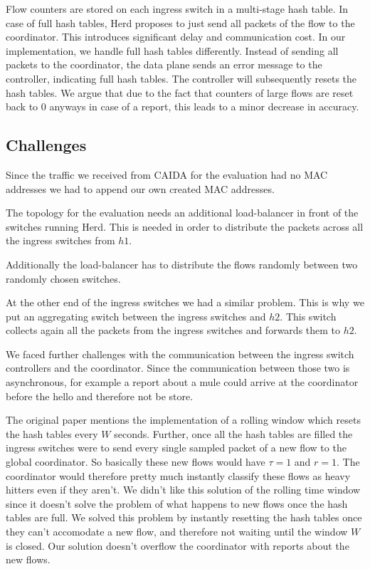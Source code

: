 \documentclass[11pt,oneside,a4paper]{article}
\begin{document}
Flow counters are stored on each ingress switch in a multi-stage hash table. In case of full hash tables, Herd proposes to just send all packets of the flow to the coordinator. This introduces significant delay and communication cost. In our implementation, we handle full hash tables differently. Instead of sending all packets to the coordinator, the data plane sends an error message to the controller, indicating full hash tables. The controller will subsequently resets the hash tables. We argue that due to the fact that counters of large flows are reset back to 0 anyways in case of a report, this leads to a minor decrease in accuracy.

\subsection{Challenges} \label{challenges}
Since the traffic we received from CAIDA for the evaluation had no MAC addresses we had to append our own created MAC addresses. 

The topology for the evaluation needs an additional load-balancer in front of the switches running Herd. This is needed in order to distribute the packets across all the ingress switches from $h1$. 

Additionally the load-balancer has to distribute the flows randomly between two randomly chosen switches. 

At the other end of the ingress switches we had a similar problem. This is why we put an aggregating switch between the ingress switches and $h2$. This switch collects again all the packets from the ingress switches and forwards them to $h2$. 

We faced further challenges with the communication between the ingress switch controllers and the coordinator. Since the communication between those two is asynchronous, for example a report about a mule could arrive at the coordinator before the hello and therefore not be store.%

The original paper mentions the implementation of a rolling window which resets the hash tables every $W$ seconds. Further, once all the hash tables are filled the ingress switches were to send every single sampled packet of a new flow to the global coordinator. So basically these new flows would have $\tau = 1$ and $r = 1$. The coordinator would therefore pretty much instantly classify these flows as heavy hitters even if they aren't. We didn't like this solution of the rolling time window since it doesn't solve the problem of what happens to new flows once the hash tables are full. We solved this problem by instantly resetting the hash tables once they can't accomodate a new flow, and therefore not waiting until the window $W$ is closed. Our solution doesn't overflow the coordinator with reports about the new flows.
\end{document}
